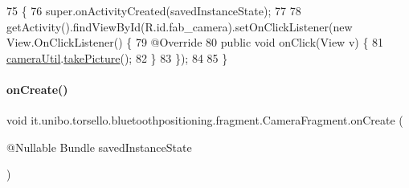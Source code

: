 \begin{DoxyCode}
75                                                                        \{
76         super.onActivityCreated(savedInstanceState);
77 
78         getActivity().findViewById(R.id.fab\_camera).setOnClickListener(\textcolor{keyword}{new} View.OnClickListener() \{
79             @Override
80             \textcolor{keyword}{public} \textcolor{keywordtype}{void} onClick(View v) \{
81                 \hyperlink{classit_1_1unibo_1_1torsello_1_1bluetoothpositioning_1_1fragment_1_1CameraFragment_a127f286f45219c7891d564cc55e2a80e_a127f286f45219c7891d564cc55e2a80e}{cameraUtil}.\hyperlink{classit_1_1unibo_1_1torsello_1_1bluetoothpositioning_1_1util_1_1CameraUtil_a4223fa54dcdd332f394f9d4b6395ec79_a4223fa54dcdd332f394f9d4b6395ec79}{takePicture}();
82             \}
83         \});
84 
85     \}
\end{DoxyCode}
\hypertarget{classit_1_1unibo_1_1torsello_1_1bluetoothpositioning_1_1fragment_1_1CameraFragment_a33a16a26a087e288d351032db23c22a1_a33a16a26a087e288d351032db23c22a1}{}\label{classit_1_1unibo_1_1torsello_1_1bluetoothpositioning_1_1fragment_1_1CameraFragment_a33a16a26a087e288d351032db23c22a1_a33a16a26a087e288d351032db23c22a1} 
\paragraph{\texorpdfstring{on\+Create()}{onCreate()}}
{\footnotesize\ttfamily void it.\+unibo.\+torsello.\+bluetoothpositioning.\+fragment.\+Camera\+Fragment.\+on\+Create (\begin{DoxyParamCaption}\item[{@Nullable Bundle}]{saved\+Instance\+State }\end{DoxyParamCaption})}


